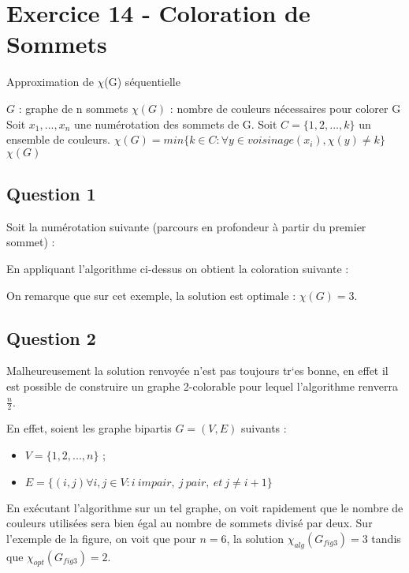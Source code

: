 
\section{Exercice 14 - Coloration de Sommets}\label{ex14}

\begin{center}
\begin{algorithm}[H]
\caption{Approximation de $\chi$(G) s\'equentielle}\label{ex14_algo}
\begin{algorithmic}[1]
\REQUIRE $G$ : graphe de n sommets
\ENSURE $\chi(G)$ : nombre de couleurs n\'ecessaires pour colorer G
\STATE Soit $x_1,...,x_n$ une num\'erotation des sommets de G.
\STATE Soit $C = \{1,2,...,k\}$ un ensemble de couleurs.
	\STATE $\chi(G) = min\{k \in C : \forall y \in voisinage(x_i), \chi(y) \neq k\}$
\ENDFOR
\RETURN $\chi(G)$
\end{algorithmic}
\end{algorithm}
\end{center}

\subsection{Question 1}\label{ex14_q1}
Soit la num\'erotation suivante (parcours en profondeur \`a partir du premier sommet) :


En appliquant l'algorithme ci-dessus on obtient la coloration suivante :

On remarque que sur cet exemple, la solution est optimale : $\chi(G) = 3$.

\subsection{Question 2}\label{ex14_q2}
Malheureusement la solution renvoy\'ee n'est pas toujours tr`es bonne, en effet il est
possible de construire un graphe 2-colorable pour lequel l'algorithme renverra
$\frac{n}{2}$.

En effet, soient les graphe bipartis $G = (V,E)$ suivants :\\
\begin{itemize}
	\item $V = \{1,2,...,n\}$ ;
	\item $E = \{(i,j) \forall i,j \in V : i\ impair,\ j\ pair,\ et\ j \neq i+1\}$
\end{itemize}



En ex\'ecutant l'algorithme sur un tel graphe, on voit rapidement que le nombre de
couleurs utilis\'ees sera bien \'egal au nombre de sommets divis\'e par deux.
Sur l'exemple de la figure, on voit que pour $n = 6$, la solution $\chi_{alg}(G_{fig3}) =
3$ tandis que $\chi_{opt}(G_{fig3}) = 2$.



